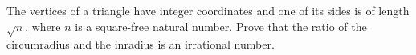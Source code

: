 The vertices of a triangle have integer coordinates and one of its sides is of length $\sqrt{n}$, where $n$ is a square-free natural number. Prove that the ratio of the circumradius and the inradius is an irrational number.